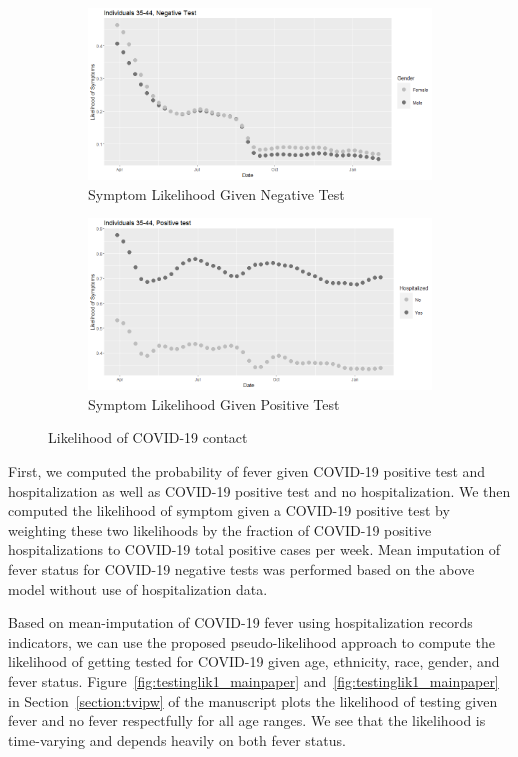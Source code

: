 \documentclass[11pt]{amsart}
\numberwithin{equation}{section}
\theoremstyle{plain}
\begin{document}
\begin{figure}[!th]
\centering
\begin{subfigure}{.5\textwidth}
 \centering
 \includegraphics[width=.9\linewidth]{../figs/tvprop_symptom_alt_fig1.png}
 \caption{Symptom Likelihood Given Negative Test}
 \label{fig:symptomlik1_model2}
\end{subfigure}%
\begin{subfigure}{.5\textwidth}
 \centering
\includegraphics[width=.9\linewidth]{../figs/tvprop_symptom_alt_fig2.png}
 \caption{Symptom Likelihood Given Positive Test}
 \label{fig:symptomlik2_model2}
\end{subfigure}
\caption{Likelihood of COVID-19 contact}
\label{fig:symptomlik_model2}
\end{figure}

First, we computed the probability of fever given COVID-19 positive test and hospitalization as well as COVID-19 positive test and no hospitalization.  We then computed the likelihood of symptom given a COVID-19 positive test by weighting these two likelihoods by the fraction of COVID-19 positive hospitalizations to COVID-19 total positive cases per week.  Mean imputation of fever status for COVID-19 negative tests was performed based on the above model without use of hospitalization data.

Based on mean-imputation of COVID-19 fever using hospitalization records indicators, we can use the proposed pseudo-likelihood approach to compute the likelihood of getting tested for COVID-19 given age, ethnicity, race, gender, and fever status.  Figure~\ref{fig:testinglik1_mainpaper} and~\ref{fig:testinglik1_mainpaper} in Section~\ref{section:tvipw} of the manuscript plots the likelihood of testing given fever and no fever respectfully for all age ranges.  We see that the likelihood is time-varying and depends heavily on both fever status.
\end{document}
